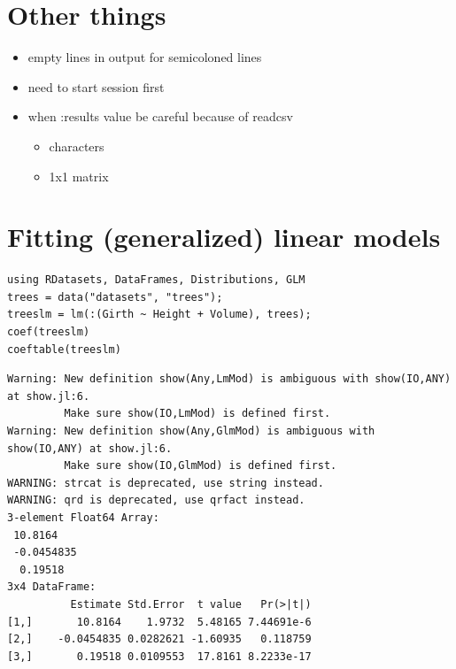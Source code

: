 \documentclass[11pt]{article}
\begin{document}
\section{Other things}
\label{sec-7}

\begin{itemize}
\item empty lines in output for semicoloned lines
\item need to start session first
\item when :results value be careful because of readcsv
\begin{itemize}
\item characters
\item 1x1 matrix
\end{itemize}
\end{itemize}
\section{Fitting (generalized) linear models}
\label{sec-8}

\begin{verbatim}
using RDatasets, DataFrames, Distributions, GLM
trees = data("datasets", "trees");
treeslm = lm(:(Girth ~ Height + Volume), trees);
coef(treeslm)
coeftable(treeslm)
\end{verbatim}

\begin{verbatim}
Warning: New definition show(Any,LmMod) is ambiguous with show(IO,ANY) at show.jl:6.
         Make sure show(IO,LmMod) is defined first.
Warning: New definition show(Any,GlmMod) is ambiguous with show(IO,ANY) at show.jl:6.
         Make sure show(IO,GlmMod) is defined first.
WARNING: strcat is deprecated, use string instead.
WARNING: qrd is deprecated, use qrfact instead.
3-element Float64 Array:
 10.8164   
 -0.0454835
  0.19518
3x4 DataFrame:
          Estimate Std.Error  t value   Pr(>|t|)
[1,]       10.8164    1.9732  5.48165 7.44691e-6
[2,]    -0.0454835 0.0282621 -1.60935   0.118759
[3,]       0.19518 0.0109553  17.8161 8.2233e-17
\end{verbatim}
\end{document}
